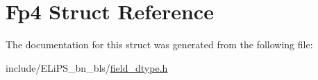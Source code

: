 \hypertarget{struct_fp4}{}\section{Fp4 Struct Reference}
\label{struct_fp4}


The documentation for this struct was generated from the following file\+:\begin{DoxyCompactItemize}
\item 
include/\+E\+Li\+P\+S\+\_\+bn\+\_\+bls/\hyperlink{field__dtype_8h}{field\+\_\+dtype.\+h}\end{DoxyCompactItemize}

